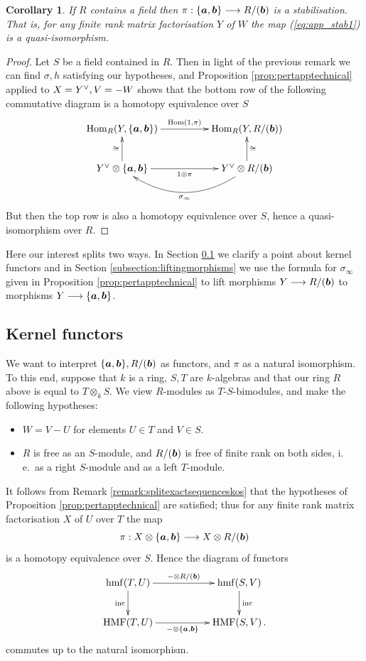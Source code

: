 \documentclass{compositio}
\newtheorem{corollary}[theorem]{Corollary}
\theoremstyle{definition}
\numberwithin{equation}{section}
\def\inc{\operatorname{inc}}
\def\Hom{\operatorname{Hom}}
\DeclareMathOperator{\hmf}{hmf}
\DeclareMathOperator{\HMF}{HMF}
\begin{document}
\begin{corollary} If $R$ contains a field then $\pi: \{\boldsymbol{a},\boldsymbol{b}\} \longrightarrow R/(\boldsymbol{b})$ is a stabilisation. That is, for any finite rank matrix factorisation $Y$ of $W$ the map (\ref{eq:app_stab1}) is a quasi-isomorphism.
\end{corollary}
\begin{proof}
Let $S$ be a field contained in $R$. Then in light of the previous remark we can find $\sigma, h$ satisfying our hypotheses, and Proposition \ref{prop:pertapptechnical} applied to $X = Y^{\vee}, V = -W$ shows that the bottom row of the following commutative diagram is a homotopy equivalence over $S$
\begin{equation}\label{eq:cons3}
\xymatrix@C+2pc{
\Hom_R(Y, \{\ba, \bb\}) \ar[r]^-{\Hom(1,\pi)} & \Hom_R(Y, R/(\bb))\\
Y^{\lor} \otimes \{ \ba, \bb \} \ar[u]^{\cong} \ar[r]_-{1 \otimes \pi} & Y^{\lor} \otimes R/(\bb) \ar@/^2pc/[l]^-{\sigma_\infty} \ar[u]_{\cong}
}
\end{equation}
But then the top row is also a homotopy equivalence over $S$, hence a quasi-isomorphism over $R$.
\end{proof}

Here our interest splits two ways. In Section \ref{subsection:kernelfunctors} we clarify a point about kernel functors and in Section \ref{subsection:liftingmorphisms} we use the formula for $\sigma_\infty$ given in Proposition \ref{prop:pertapptechnical} to lift morphisms $Y \longrightarrow R/(\boldsymbol{b})$ to morphisms $Y \longrightarrow \{ \boldsymbol{a}, \boldsymbol{b} \}$.

\subsection{Kernel functors}\label{subsection:kernelfunctors}

We want to interpret $\{ \boldsymbol{a}, \boldsymbol{b} \}, R/(\boldsymbol{b})$ as functors, and $\pi$ as a natural isomorphism. To this end, suppose that $k$ is a ring, $S,T$ are $k$-algebras and that our ring $R$ above is equal to $T \otimes_k S$. We view $R$-modules as $T$-$S$-bimodules, and make the following hypotheses:
\begin{itemize}
\item $W = V - U$ for elements $U \in T$ and $V \in S$.
\item $R$ is free as an $S$-module, and $R/(\boldsymbol{b})$ is free of finite rank on both sides, i.\,e.~as a right $S$-module and as a left $T$-module.
\end{itemize}
It follows from Remark \ref{remark:splitexactsequenceskos} that the hypotheses of Proposition \ref{prop:pertapptechnical} are satisfied; thus for any finite rank matrix factorisation $X$ of $U$ over $T$ the map
\[
\pi: X \otimes \{ \boldsymbol{a}, \boldsymbol{b} \} \longrightarrow X \otimes R/(\boldsymbol{b})
\]
is a homotopy equivalence over $S$. Hence the diagram of functors
\[
\xymatrix@C+2.5pc{
\hmf(T, U) \ar[d]_-{\inc}\ar[r]^-{- \otimes R/(\bb)} & \hmf(S,V) \ar[d]^-{\inc}\\
\HMF(T, U) \ar[r]_-{- \otimes \{ \bs{a}, \bs{b} \}} & \HMF(S,V)\,.
}
\]
commutes up to the natural isomorphism.
\end{document}
